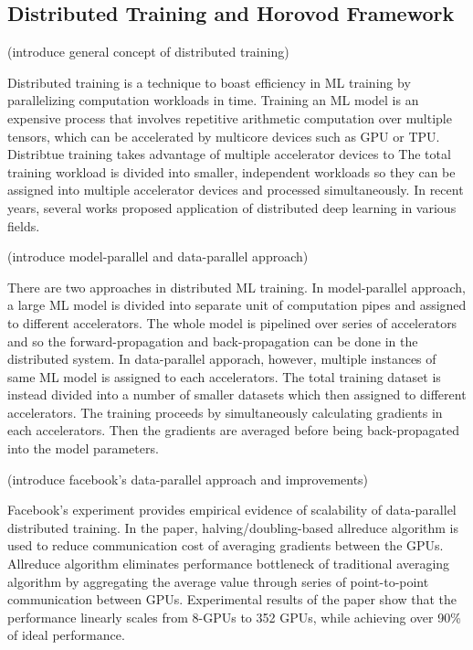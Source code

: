 \subsection{Distributed Training and Horovod Framework}

(introduce general concept of distributed training)

Distributed training is a technique to boast efficiency in ML training
by parallelizing computation workloads in time.
Training an ML model is an expensive process that involves repetitive
arithmetic computation over multiple tensors,
which can be accelerated by multicore devices such as GPU or TPU. 
Distribtue training takes advantage of multiple accelerator devices to
The total training workload is divided into smaller, independent workloads
so they can be assigned into multiple accelerator devices and
processed simultaneously. 
In recent years, several works proposed application of distributed
deep learning in various fields.

(introduce model-parallel and data-parallel approach\cite{approaches2019Mao})

There are two approaches in distributed ML training.
In model-parallel approach, a large ML model is divided into separate unit
of computation pipes and assigned to different accelerators. The whole model
is pipelined over series of accelerators and so the forward-propagation and
back-propagation can be done in the distributed system.
In data-parallel apporach, however, multiple instances of same ML model
is assigned to each accelerators. The total training dataset is instead
divided into a number of smaller datasets which then assigned to different
accelerators. The training proceeds by simultaneously calculating gradients
in each accelerators. Then the gradients are averaged before being 
back-propagated into the model parameters.

(introduce facebook's data-parallel approach and improvements)

Facebook's experiment \cite{facebook2018} provides empirical evidence of
scalability of data-parallel distributed training. In the paper, 
halving/doubling-based allreduce algorithm is used to reduce communication cost 
of averaging gradients between the GPUs. 
Allreduce algorithm eliminates performance bottleneck of traditional
averaging algorithm by aggregating the average value through series of
point-to-point communication between GPUs. 
Experimental results of the paper show that the performance linearly
scales from 8-GPUs to 352 GPUs, while achieving over 90\% of ideal performance.

